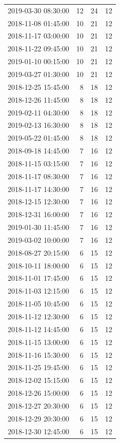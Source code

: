 \begin{tabular}{lrrr}
2019-03-30 08:30:00 & 12 & 24 & 12 \\
2018-11-08 01:45:00 & 10 & 21 & 12 \\
2018-11-17 03:00:00 & 10 & 21 & 12 \\
2018-11-22 09:45:00 & 10 & 21 & 12 \\
2019-01-10 00:15:00 & 10 & 21 & 12 \\
2019-03-27 01:30:00 & 10 & 21 & 12 \\
2018-12-25 15:45:00 & 8 & 18 & 12 \\
2018-12-26 11:45:00 & 8 & 18 & 12 \\
2019-02-11 04:30:00 & 8 & 18 & 12 \\
2019-02-13 16:30:00 & 8 & 18 & 12 \\
2019-05-22 01:45:00 & 8 & 18 & 12 \\
2018-09-18 14:45:00 & 7 & 16 & 12 \\
2018-11-15 03:15:00 & 7 & 16 & 12 \\
2018-11-17 08:30:00 & 7 & 16 & 12 \\
2018-11-17 14:30:00 & 7 & 16 & 12 \\
2018-12-15 12:30:00 & 7 & 16 & 12 \\
2018-12-31 16:00:00 & 7 & 16 & 12 \\
2019-01-30 11:45:00 & 7 & 16 & 12 \\
2019-03-02 10:00:00 & 7 & 16 & 12 \\
2018-08-27 20:15:00 & 6 & 15 & 12 \\
2018-10-11 18:00:00 & 6 & 15 & 12 \\
2018-11-01 17:45:00 & 6 & 15 & 12 \\
2018-11-03 12:15:00 & 6 & 15 & 12 \\
2018-11-05 10:45:00 & 6 & 15 & 12 \\
2018-11-12 12:30:00 & 6 & 15 & 12 \\
2018-11-12 14:45:00 & 6 & 15 & 12 \\
2018-11-15 13:00:00 & 6 & 15 & 12 \\
2018-11-16 15:30:00 & 6 & 15 & 12 \\
2018-11-25 19:45:00 & 6 & 15 & 12 \\
2018-12-02 15:15:00 & 6 & 15 & 12 \\
2018-12-26 15:00:00 & 6 & 15 & 12 \\
2018-12-27 20:30:00 & 6 & 15 & 12 \\
2018-12-29 20:30:00 & 6 & 15 & 12 \\
2018-12-30 12:45:00 & 6 & 15 & 12 \\

\end{tabular}
